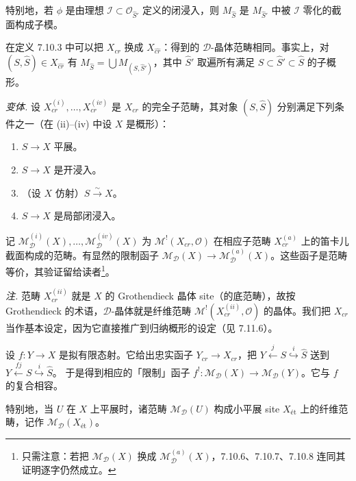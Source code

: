特别地，若 $\phi$ 是由理想 $\mathcal{I}\subset\mathcal{O}_{\hat S'}$ 定义的闭浸入，则 $M_{\hat S}$ 是 $M_{\hat S'}$ 中被 $\mathcal{I}$ 零化的截面构成子模。

在定义 7.10.3 中可以把 $X_{cr}$ 换成 $X_{\widehat{cr}}$：得到的 $\mathcal{D}$-晶体范畴相同。事实上，对 $(S,\hat S)\in X_{\widehat{cr}}$ 有 $M_{\hat S}=\bigcup M_{(S,\hat S')}$，其中 $\hat S'$ 取遍所有满足 $S\subset\hat S'\subset\hat S$ 的子概形。

 \emph{变体.} 设 $X_{cr}^{(i)},\ldots,X_{cr}^{(iv)}$ 是 $X_{cr}$ 的完全子范畴，其对象 $(S,\hat S)$ 分别满足下列条件之一（在 (ii)--(iv) 中设 $X$ 是概形）：
\begin{enumerate}[label=(\roman*),leftmargin=2.2em]
\item $S\to X$ 平展。
\item $S\to X$ 是开浸入。
\item （设 $X$ 仿射）$S\xrightarrow{\sim}X$。
\item $S\to X$ 是局部闭浸入。
\end{enumerate}

记 $\mathcal{M}^{(i)}_{\mathcal{D}}(X),\ldots,\mathcal{M}^{(iv)}_{\mathcal{D}}(X)$ 为 $\mathcal{M}^{!}(X_{cr},\mathcal{O})$ 在相应子范畴 $X_{cr}^{(a)}$ 上的笛卡儿截面构成的范畴。有显然的限制函子 $\mathcal{M}_{\mathcal{D}}(X)\to\mathcal{M}^{(a)}_{\mathcal{D}}(X)$。这些函子是范畴等价，其验证留给读者\footnote{只需注意：若把 $\mathcal{M}_{\mathcal{D}}(X)$ 换成 $\mathcal{M}^{(a)}_{\mathcal{D}}(X)$，7.10.6、7.10.7、7.10.8 连同其证明逐字仍然成立。}。

\emph{注.} 范畴 $X_{cr}^{(ii)}$ 就是 $X$ 的 Grothendieck 晶体 site（的底范畴），故按 Grothendieck 的术语，$\mathcal{D}$-晶体就是纤维范畴 $\mathcal{M}^{!}(X_{cr}^{(ii)},\mathcal{O})$ 的晶体。我们把 $X_{cr}$ 当作基本设定，因为它直接推广到归纳概形的设定（见 7.11.6）。

 设 $f:Y\to X$ 是拟有限态射。它给出忠实函子 $Y_{cr}\to X_{cr}$，把 $Y\overset{j}{\longleftarrow}S\overset{i}{\hookrightarrow}\hat S$ 送到 $Y\overset{fj}{\longleftarrow}S\overset{i}{\hookrightarrow}\hat S$。%
于是得到相应的「限制」函子 $f^{!}:\mathcal{M}_{\mathcal{D}}(X)\to\mathcal{M}_{\mathcal{D}}(Y)$。它与 $f$ 的复合相容。

特别地，当 $U$ 在 $X$ 上平展时，诸范畴 $\mathcal{M}_{\mathcal{D}}(U)$ 构成小平展 site $X_{\text{ét}}$ 上的纤维范畴，记作 $\mathcal{M}_{\mathcal{D}}(X_{\text{ét}})$。

